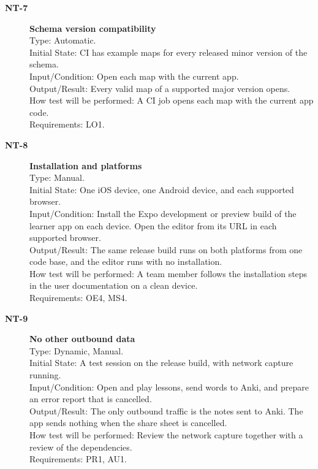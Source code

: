 \documentclass[12pt, titlepage]{article}
\newcommand{\tid}[1]{\hypertarget{test:#1}{\textbf{#1}}}
\begin{document}
\begin{description}

\item[\tid{NT-7}] \textbf{Schema version compatibility}\\
Type: Automatic.\\
Initial State: CI has example maps for every released minor version of the
schema.\\
Input/Condition: Open each map with the current app.\\
Output/Result: Every valid map of a supported major version opens.\\
How test will be performed: A CI job opens each map with the current app code.\\
Requirements: LO1.

\item[\tid{NT-8}] \textbf{Installation and platforms}\\
Type: Manual.\\
Initial State: One iOS device, one Android device, and each supported browser.\\
Input/Condition: Install the Expo development or preview build of the learner
app on each device. Open the editor from its URL in each supported browser.\\
Output/Result: The same release build runs on both platforms from one code
base, and the editor runs with no installation.\\
How test will be performed: A team member follows the installation steps in the
user documentation on a clean device.\\
Requirements: OE4, MS4.

\item[\tid{NT-9}] \textbf{No other outbound data}\\
Type: Dynamic, Manual.\\
Initial State: A test session on the release build, with network capture
running.\\
Input/Condition: Open and play lessons, send words to Anki, and prepare an error
report that is cancelled.\\
Output/Result: The only outbound traffic is the notes sent to Anki. The app
sends nothing when the share sheet is cancelled.\\
How test will be performed: Review the network capture together with a review of
the dependencies.\\
Requirements: PR1, AU1.

\end{description}
\end{document}
